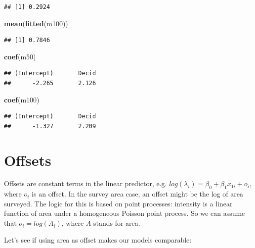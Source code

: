 \documentclass[12pt,]{book}
\newenvironment{Shaded}{\begin{snugshade}}{\end{snugshade}}
\newcommand{\KeywordTok}[1]{\textcolor[rgb]{0.13,0.29,0.53}{\textbf{#1}}}
\newcommand{\NormalTok}[1]{#1}
\begin{document}
\begin{verbatim}
## [1] 0.2924
\end{verbatim}

\begin{Shaded}
\begin{Highlighting}[]
\KeywordTok{mean}\NormalTok{(}\KeywordTok{fitted}\NormalTok{(m100))}
\end{Highlighting}
\end{Shaded}

\begin{verbatim}
## [1] 0.7846
\end{verbatim}

\begin{Shaded}
\begin{Highlighting}[]
\KeywordTok{coef}\NormalTok{(m50)}
\end{Highlighting}
\end{Shaded}

\begin{verbatim}
## (Intercept)       Decid 
##      -2.265       2.126
\end{verbatim}

\begin{Shaded}
\begin{Highlighting}[]
\KeywordTok{coef}\NormalTok{(m100)}
\end{Highlighting}
\end{Shaded}

\begin{verbatim}
## (Intercept)       Decid 
##      -1.327       2.209
\end{verbatim}

\hypertarget{offsets}{%
\section{Offsets}\label{offsets}}

Offsets are constant terms in the linear predictor,
e.g. \(log(\lambda_i) = \beta_0 + \beta_1 x_{1i} + o_i\),
where \(o_i\) is an offset. In the survey area case,
an offset might be the log of area surveyed.
The logic for this is based on point processes:
intensity is a linear function of area
under a homogeneous Poisson point process.
So we can assume that \(o_i = log(A_i)\), where \(A\) stands for area.

Let's see if using area as offset makes our models comparable:
\end{document}
